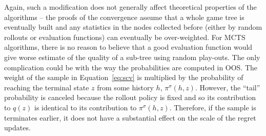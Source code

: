 Again, such a modification does not generally affect theoretical properties of the algorithms -- the proofs of the convergence assume that a whole game tree is eventually built and any statistics in the nodes collected before (either by random rollouts or evaluation functions) can eventually be over-weighted. For MCTS algorithms, there is no reason to believe that a good evaluation function would give worse estimate of the quality of a sub-tree using random play-outs.
The only complication could be with the way the probabilities are computed in OOS. The weight of the sample in Equation~\ref{eq:scv} is multiplied by the probability of reaching the terminal state $z$ from some history $h$, $\pi^\sigma(h,z)$. However, the ``tail'' probability is canceled because the rollout policy is fixed and so its contribution to $q(z)$ is identical to its contribution to $\pi^\sigma(h,z)$. Therefore, if the sample is terminates earlier, it does not have a substantial effect on the scale of the regret updates.


